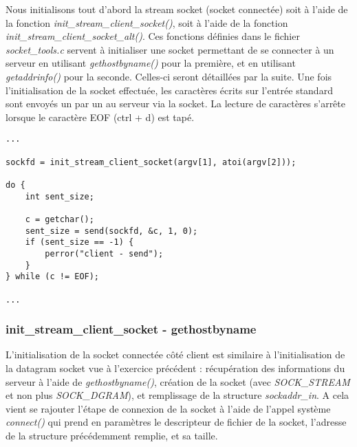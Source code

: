 \documentclass[a4paper, frenchb, 11pt]{article}
\begin{document}
Nous initialisons tout d'abord la stream socket (socket connectée) soit à l'aide de la fonction \emph{init\_stream\_client\_socket()}, soit à l'aide de la fonction \emph{init\_stream\_client\_socket\_alt()}. Ces fonctions définies dans le fichier \emph{socket\_tools.c} servent à initialiser une socket permettant de se connecter à un serveur en utilisant \emph{gethostbyname()} pour la première, et en utilisant \emph{getaddrinfo()} pour la seconde. Celles-ci seront détaillées par la suite. Une fois l'initialisation de la socket effectuée, les caractères écrits sur l'entrée standard sont envoyés un par un au serveur via la socket. La lecture de caractères s'arrête lorsque le caractère EOF (ctrl + d) est tapé.

\begin{lstlisting}
...

sockfd = init_stream_client_socket(argv[1], atoi(argv[2]));

do {
    int sent_size;

    c = getchar();
    sent_size = send(sockfd, &c, 1, 0);
    if (sent_size == -1) {
        perror("client - send");
    }
} while (c != EOF);

...
\end{lstlisting}

\subsubsection{init\_stream\_client\_socket - gethostbyname}
L'initialisation de la socket connectée côté client est similaire à l'initialisation de la datagram socket vue à l'exercice précédent : récupération des informations du serveur à l'aide de \emph{gethostbyname()}, création de la socket (avec \emph{SOCK\_STREAM} et non plus \emph{SOCK\_DGRAM}), et remplissage de la structure \emph{sockaddr\_in}. A cela vient se rajouter l'étape de connexion de la socket à l'aide de l'appel système \emph{connect()} qui prend en paramètres le descripteur de fichier de la socket, l'adresse de la structure précédemment remplie, et sa taille.\\
\end{document}
